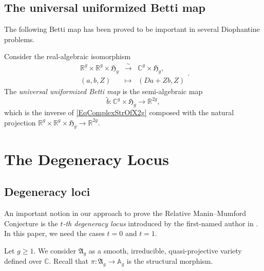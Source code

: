 \documentclass[12pt,oneside]{amsart}
\numberwithin{maincounter}{section}
\numberwithin{equation}{section}
\def\AA{\mathbb{A}}
\def\RR{\mathbb{R}}
\def\CC{\mathbb{C}}
\newcommand{\IC}{{\CC}}
\newcommand{\IR}{{\RR}}
\newcommand{\IA}{{\AA}}
\begin{document}
\subsection{The universal uniformized Betti map}
The following Betti map has been proved to be important in several Diophantine problems.

Consider the real-algebraic isomorphism
\begin{equation}\label{EqComplexStrOfX2g}
\begin{array}{cccc}
 \mathbb{R}^g \times \mathbb{R}^g \times \mathfrak{H}_g & \xrightarrow{\sim} & \mathbb{C}^g \times \mathfrak{H}_g, \\
 (a,b,Z) & \mapsto & (Da+Zb, Z)
\end{array}.
\end{equation}
The \textit{universal uniformized Betti map} is the semi-algebraic map
\begin{equation}\label{EqUnivBettiMap}
\tilde{b} \colon \IC^{g} \times \mathfrak{H}_g \rightarrow \IR^{2g},
\end{equation}
which is the inverse of \eqref{EqComplexStrOfX2g} composed with the natural projection $ \mathbb{R}^g \times \mathbb{R}^g \times \mathfrak{H}_g \rightarrow \IR^{2g}$.



\section{The Degeneracy Locus}
\label{secdeglocus}
\subsection{Degeneracy loci}
An important notion in our approach to prove the Relative
Manin--Mumford Conjecture is the \textit{$t$-th degeneracy locus}
introduced by the first-named author in \cite[Definition~1.6]{GaoBettiRank}.
In this paper, we need the cases $t = 0$ and $t = 1$.

Let $g\ge 1$. We consider $\mathfrak{A}_g$ as a smooth, irreducible,
quasi-projective variety defined over $\IC$. Recall that $\pi\colon
\mathfrak{A}_g\rightarrow\IA_g$ is the structural morphism.
\end{document}
